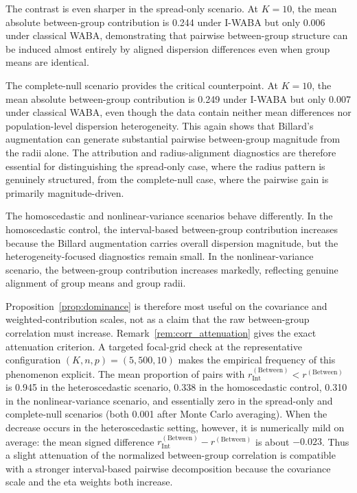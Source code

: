 \documentclass[preprint, times, 12pt, authoryear]{elsarticle}
\begin{document}
The contrast is even sharper in the spread-only scenario. At $K=10$, the mean absolute between-group contribution is 0.244 under I-WABA but only 0.006 under classical WABA, demonstrating that pairwise between-group structure can be induced almost entirely by aligned dispersion differences even when group means are identical.

The complete-null scenario provides the critical counterpoint. At $K=10$, the mean absolute between-group contribution is 0.249 under I-WABA but only 0.007 under classical WABA, even though the data contain neither mean differences nor population-level dispersion heterogeneity. This again shows that Billard's augmentation can generate substantial pairwise between-group magnitude from the radii alone. The attribution and radius-alignment diagnostics are therefore essential for distinguishing the spread-only case, where the radius pattern is genuinely structured, from the complete-null case, where the pairwise gain is primarily magnitude-driven.

The homoscedastic and nonlinear-variance scenarios behave differently. In the homoscedastic control, the interval-based between-group contribution increases because the Billard augmentation carries overall dispersion magnitude, but the heterogeneity-focused diagnostics remain small. In the nonlinear-variance scenario, the between-group contribution increases markedly, reflecting genuine alignment of group means and group radii.

Proposition~\ref{prop:dominance} is therefore most useful on the covariance and weighted-contribution scales, not as a claim that the raw between-group correlation must increase. Remark~\ref{rem:corr_attenuation} gives the exact attenuation criterion. A targeted focal-grid check at the representative configuration $(K,n,p)=(5,500,10)$ makes the empirical frequency of this phenomenon explicit. The mean proportion of pairs with $r_{\mathrm{Int}}^{(\mathrm{Between})}<r^{(\mathrm{Between})}$ is 0.945 in the heteroscedastic scenario, 0.338 in the homoscedastic control, 0.310 in the nonlinear-variance scenario, and essentially zero in the spread-only and complete-null scenarios (both 0.001 after Monte Carlo averaging). When the decrease occurs in the heteroscedastic setting, however, it is numerically mild on average: the mean signed difference $r_{\mathrm{Int}}^{(\mathrm{Between})}-r^{(\mathrm{Between})}$ is about $-0.023$. Thus a slight attenuation of the normalized between-group correlation is compatible with a stronger interval-based pairwise decomposition because the covariance scale and the eta weights both increase.
\end{document}
